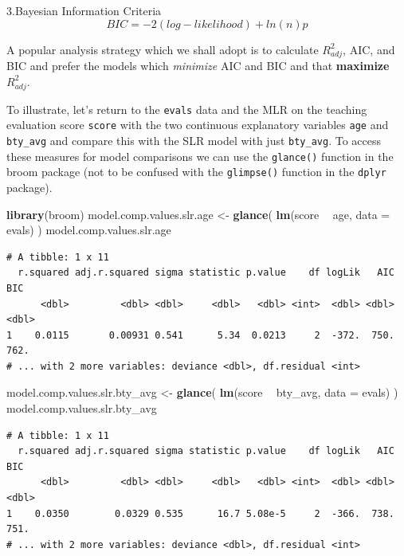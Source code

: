 \documentclass[]{article}
\newenvironment{Shaded}{\begin{snugshade}}{\end{snugshade}}
\newcommand{\KeywordTok}[1]{\textcolor[rgb]{0.13,0.29,0.53}{\textbf{#1}}}
\newcommand{\DataTypeTok}[1]{\textcolor[rgb]{0.13,0.29,0.53}{#1}}
\newcommand{\StringTok}[1]{\textcolor[rgb]{0.31,0.60,0.02}{#1}}
\newcommand{\OperatorTok}[1]{\textcolor[rgb]{0.81,0.36,0.00}{\textbf{#1}}}
\newcommand{\NormalTok}[1]{#1}
\begin{document}
3.Bayesian Information Criteria \[BIC = -2(log-likelihood) + ln(n)p\]

A popular analysis strategy which we shall adopt is to calculate
\(R^2_{adj}\), AIC, and BIC and prefer the models which \emph{minimize}
AIC and BIC and that \textbf{maximize} \(R^2_{adj}\).

To illustrate, let's return to the \texttt{evals} data and the MLR on
the teaching evaluation score \texttt{score} with the two continuous
explanatory variables \texttt{age} and \texttt{bty\_avg} and compare
this with the SLR model with just \texttt{bty\_avg}. To access these
measures for model comparisons we can use the \texttt{glance()} function
in the broom package (not to be confused with the \texttt{glimpse()}
function in the \texttt{dplyr} package).

\begin{Shaded}
\begin{Highlighting}[]
\KeywordTok{library}\NormalTok{(broom)}
\NormalTok{model.comp.values.slr.age <-}\StringTok{ }\KeywordTok{glance}\NormalTok{( }\KeywordTok{lm}\NormalTok{(score }\OperatorTok{~}\StringTok{ }\NormalTok{age, }\DataTypeTok{data =}\NormalTok{ evals) )}
\NormalTok{model.comp.values.slr.age}
\end{Highlighting}
\end{Shaded}

\begin{verbatim}
# A tibble: 1 x 11
  r.squared adj.r.squared sigma statistic p.value    df logLik   AIC   BIC
      <dbl>         <dbl> <dbl>     <dbl>   <dbl> <int>  <dbl> <dbl> <dbl>
1    0.0115       0.00931 0.541      5.34  0.0213     2  -372.  750.  762.
# ... with 2 more variables: deviance <dbl>, df.residual <int>
\end{verbatim}

\begin{Shaded}
\begin{Highlighting}[]
\NormalTok{model.comp.values.slr.bty_avg <-}\StringTok{ }\KeywordTok{glance}\NormalTok{( }\KeywordTok{lm}\NormalTok{(score }\OperatorTok{~}\StringTok{ }\NormalTok{bty_avg, }\DataTypeTok{data =}\NormalTok{ evals) )}
\NormalTok{model.comp.values.slr.bty_avg}
\end{Highlighting}
\end{Shaded}

\begin{verbatim}
# A tibble: 1 x 11
  r.squared adj.r.squared sigma statistic p.value    df logLik   AIC   BIC
      <dbl>         <dbl> <dbl>     <dbl>   <dbl> <int>  <dbl> <dbl> <dbl>
1    0.0350        0.0329 0.535      16.7 5.08e-5     2  -366.  738.  751.
# ... with 2 more variables: deviance <dbl>, df.residual <int>
\end{verbatim}
\end{document}
